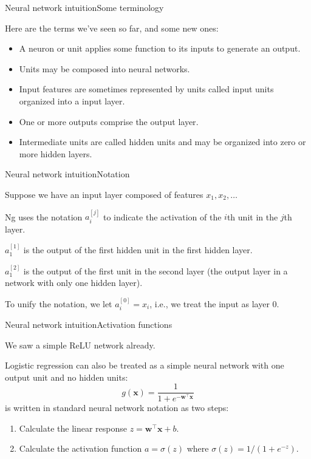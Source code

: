 \documentclass{beamer}
\renewcommand{\vec}[1]{\boldsymbol{#1}}
\begin{document}
\begin{frame}{Neural network intuition}{Some terminology}

  Here are the terms we've seen so far, and some new ones:
  \begin{itemize}
  \item A \alert{neuron} or \alert{unit} applies some function to its
    inputs to generate an output.
  \item Units may be composed into \alert{neural networks}.
  \item Input features are sometimes represented by units called
    \alert{input units} organized into a \alert{input layer}.
  \item One or more outputs comprise the \alert{output layer}.
  \item Intermediate units are called \alert{hidden units} and may be
    organized into zero or more \alert{hidden layers}.
  \end{itemize}

\end{frame}


\begin{frame}{Neural network intuition}{Notation}

  Suppose we have an input layer composed of features $x_1, x_2, \ldots$

  \medskip

  Ng uses the notation $a_i^{[j]}$ to indicate the \alert{activation}
  of the $i$th unit in the $j$th layer.

  \medskip

  $a_1^{[1]}$ is the output of the first hidden unit in the first hidden layer.

  \medskip

  $a_1^{[2]}$ is the output of the first unit in the second layer
  (the output layer in a network with only one hidden layer).

  \medskip

  To unify the notation, we let $a_i^{[0]} = x_i$, i.e., we treat
  the input as layer 0.

\end{frame}


\begin{frame}{Neural network intuition}{Activation functions}

  We saw a simple ReLU network already.

  \medskip

  \alert{Logistic regression} can also be treated as a simple neural network
  with one output unit and no hidden units:
  \[ g(\vec{x}) = \frac{1}{1+e^{-\vec{w}^\top\vec{x}}} \]
  is written in standard neural network notation as two steps:
  \begin{enumerate}
  \item Calculate the \alert{linear response} $z = \vec{w}^\top\vec{x}+b$.
  \item Calculate the \alert{activation function} $a = \sigma(z)$ where
    $\sigma(z) = 1 / (1+e^{-z})$.
  \end{enumerate}

\end{frame}
\end{document}
